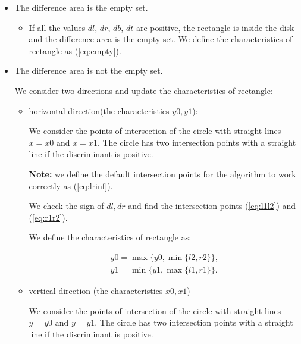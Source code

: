 \documentclass{report}
\begin{document}
\begin{itemize}
	
	\item The difference area is the empty set.
	
	\begin{itemize}
		
 		\item If all the values $dl$, $dr$, $db$, $dt$  are positive, the rectangle is inside the disk and the difference area is the empty set. We define the characteristics of rectangle as (\ref{eq:empty}).
 		
 	\end{itemize}
 
   \item The difference area is not the empty set.
 
   We consider two directions and update the characteristics of rectangle:
	
	\begin{itemize}
		
		\item \underline {horizontal direction(the characteristics $y0, y1$)}:
		
		We consider the points of intersection of the circle with straight lines $x = x0$ and $x = x1$. The circle has two intersection points with a straight line if the discriminant is positive.
		
		{\bfseries Note:} we define the default intersection points for the algorithm to work correctly as (\ref{eq:lrinf}).
		
		We check the sign of $dl, dr$ and find the intersection points (\ref{eq:l1l2}) and (\ref{eq:r1r2}).
		
		We define the characteristics of rectangle as:
		
		\begin{equation}
			\begin{gathered}
				y0 = \max\{y0, \min\{l2, r2\}\},\\
				y1 = \min\{y1, \max\{l1, r1\}\}.
			\end{gathered}
		\end{equation}
		
		\item \underline {vertical direction (the characteristics $x0, x1$) }
		
		 We consider the points of intersection of the circle with straight lines $y = y0$ and $y = y1$. The circle has two intersection points with a straight line if the discriminant is positive.
		

\end{itemize}
\end{itemize}
\end{document}
